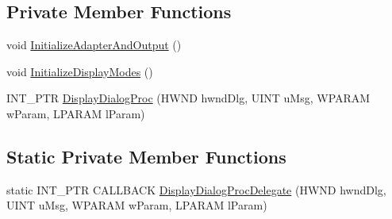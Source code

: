 \subsection*{Private Member Functions}
\begin{DoxyCompactItemize}
\item 
void \hyperlink{classmage_1_1_display_configurator_a03fd2c38f6fdb6fbc8ff429a7d0d2a89}{Initialize\+Adapter\+And\+Output} ()
\item 
void \hyperlink{classmage_1_1_display_configurator_a90ecffb8d93768464bb1698531a34db7}{Initialize\+Display\+Modes} ()
\item 
I\+N\+T\+\_\+\+P\+TR \hyperlink{classmage_1_1_display_configurator_a6b43b4d9a5e5beeee435bf93fc9865ef}{Display\+Dialog\+Proc} (H\+W\+ND hwnd\+Dlg, U\+I\+NT u\+Msg, W\+P\+A\+R\+AM w\+Param, L\+P\+A\+R\+AM l\+Param)
\end{DoxyCompactItemize}
\subsection*{Static Private Member Functions}
\begin{DoxyCompactItemize}
\item 
static I\+N\+T\+\_\+\+P\+TR C\+A\+L\+L\+B\+A\+CK \hyperlink{classmage_1_1_display_configurator_a3a15e6afa93904c2aaab6c4f5c501fb4}{Display\+Dialog\+Proc\+Delegate} (H\+W\+ND hwnd\+Dlg, U\+I\+NT u\+Msg, W\+P\+A\+R\+AM w\+Param, L\+P\+A\+R\+AM l\+Param)
\end{DoxyCompactItemize}
